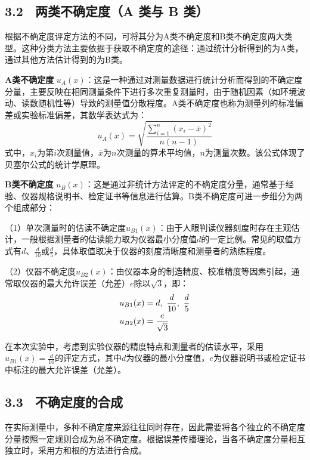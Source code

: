 \documentclass[11pt]{article}
\begin{document}
\subsection*{3.2 \ 两类不确定度（A 类与 B 类）}

根据不确定度评定方法的不同，可将其分为A类不确定度和B类不确定度两大类型。这种分类方法主要依据于获取不确定度的途径：通过统计分析得到的为A类，通过其他方法估计得到的为B类。

\textbf{A类不确定度} $u_A(x)$：这是一种通过对测量数据进行统计分析而得到的不确定度分量，主要反映在相同测量条件下进行多次重复测量时，由于随机因素（如环境波动、读数随机性等）导致的测量值分散程度。A类不确定度也称为测量列的标准偏差或实验标准偏差，其数学表达式为：
\begin{equation}
   u_A(x)=\sqrt{\frac{\sum_{i=1}^n(x_i-\overline x)^2}{n(n-1)}}
\end{equation}
式中，$x_i$为第$i$次测量值，$\overline x$为$n$次测量的算术平均值，$n$为测量次数。该公式体现了贝塞尔公式的统计学原理。

\textbf{B类不确定度} $u_B(x)$：这是通过非统计方法评定的不确定度分量，通常基于经验、仪器规格说明书、检定证书等信息进行估算。B类不确定度可进一步细分为两个组成部分：

（1）单次测量时的估读不确定度$u_{B1}(x)$：由于人眼判读仪器刻度时存在主观估计，一般根据测量者的估读能力取为仪器最小分度值$d$的一定比例。常见的取值方式有$d$、$\frac{d}{10}$或$\frac{d}{5}$，具体取值取决于仪器的刻度清晰度和测量者的熟练程度。

（2）仪器不确定度$u_{B2}(x)$：由仪器本身的制造精度、校准精度等因素引起，通常取仪器的最大允许误差（允差）$e$除以$\sqrt{3}$，即：
\begin{align}
   u_{B1}(x)&=d,\ \frac{d}{10},\ \frac{d}{5}\notag\\
   u_{B2}(x)&=\frac{e}{\sqrt 3} 
\end{align}

在本次实验中，考虑到实验仪器的精度特点和测量者的估读水平，采用$u_{B1}(x)=\frac{d}{10}$的评定方式，其中$d$为仪器的最小分度值，$e$为仪器说明书或检定证书中标注的最大允许误差（允差）。

\subsection*{3.3 \ 不确定度的合成}

在实际测量中，多种不确定度来源往往同时存在，因此需要将各个独立的不确定度分量按照一定规则合成为总不确定度。根据误差传播理论，当各不确定度分量相互独立时，采用方和根的方法进行合成。
\end{document}
